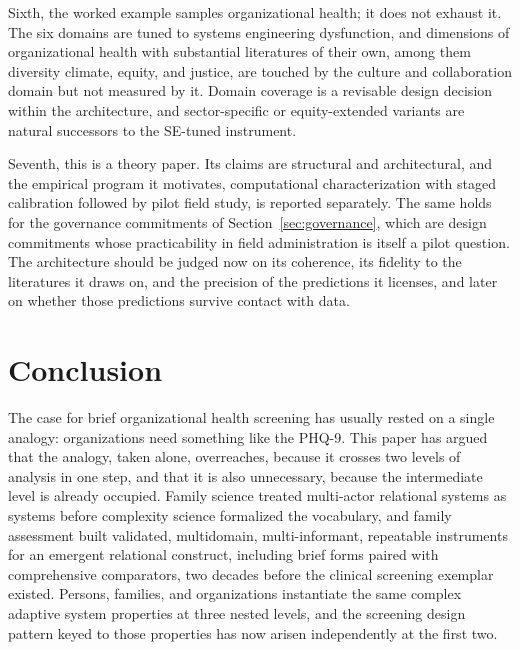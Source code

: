 \documentclass[12pt, letterpaper]{article}
\begin{document}
Sixth, the worked example samples organizational health; it does not exhaust it. The six domains are tuned to systems engineering dysfunction, and dimensions of organizational health with substantial literatures of their own, among them diversity climate, equity, and justice, are touched by the culture and collaboration domain but not measured by it. Domain coverage is a revisable design decision within the architecture, and sector-specific or equity-extended variants are natural successors to the SE-tuned instrument.

Seventh, this is a theory paper. Its claims are structural and architectural, and the empirical program it motivates, computational characterization with staged calibration followed by pilot field study, is reported separately. The same holds for the governance commitments of Section~\ref{sec:governance}, which are design commitments whose practicability in field administration is itself a pilot question. The architecture should be judged now on its coherence, its fidelity to the literatures it draws on, and the precision of the predictions it licenses, and later on whether those predictions survive contact with data.

\section{Conclusion}
\label{sec:conclusion}

The case for brief organizational health screening has usually rested on a single analogy: organizations need something like the PHQ-9. This paper has argued that the analogy, taken alone, overreaches, because it crosses two levels of analysis in one step, and that it is also unnecessary, because the intermediate level is already occupied. Family science treated multi-actor relational systems as systems before complexity science formalized the vocabulary, and family assessment built validated, multidomain, multi-informant, repeatable instruments for an emergent relational construct, including brief forms paired with comprehensive comparators, two decades before the clinical screening exemplar existed. Persons, families, and organizations instantiate the same complex adaptive system properties at three nested levels, and the screening design pattern keyed to those properties has now arisen independently at the first two.
\end{document}
